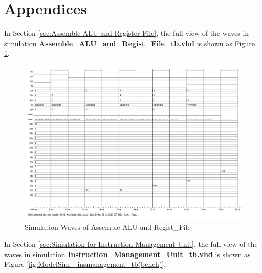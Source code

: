 \documentclass[12pt,a4paper]{article}
\begin{document}


\tableofcontents


\clearpage


\clearpage


\clearpage


\clearpage


\clearpage


\clearpage


\appendix

\section{Appendices}
\label{AppendicesA}

In Section \ref{sec:Assemble ALU and Register File}, the full view of the waves in simulation \textbf{Assemble\_ALU\_and\_Regist\_File\_tb.vhd} is shown as Figure \ref{fig:ModelSim_ assemble_processing_unit_tb(test_bench)}.

\begin{figure}[htp]
  \centering
  \includegraphics[width=1.5\textwidth,angle = 270]{picture/ModelSim_ assemble_processing_unit_tb(test_bench).pdf}
  \caption{Simulation Waves of Assemble ALU and Regist\_File}     
  \label{fig:ModelSim_ assemble_processing_unit_tb(test_bench)}
\end{figure}

In Section \ref{sec:Simulation for Instruction Management Unit}, the full view of the waves in simulation \textbf{Instruction\_Management\_Unit\_tb.vhd} is shown as Figure \ref{fig:ModelSim_ insmanagement_tb(bench)}.
\end{document}
